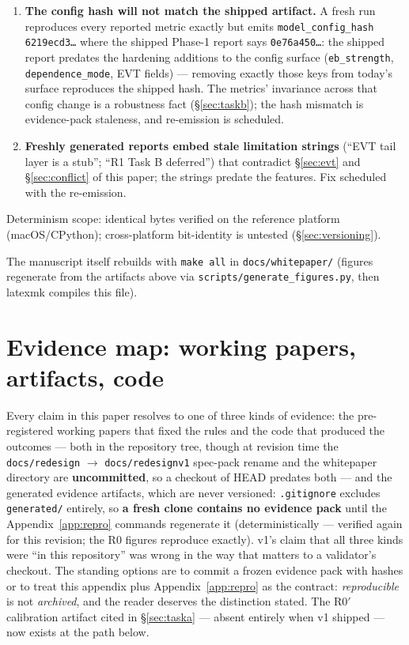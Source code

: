 \documentclass[11pt]{article}
\begin{document}
\begin{enumerate}[leftmargin=1.6em]
\item \textbf{The config hash will not match the shipped artifact.} A fresh
  run reproduces every reported metric exactly but emits
  \texttt{model\_config\_hash 6219ecd3\ldots} where the shipped Phase-1
  report says \texttt{0e76a450\ldots}: the shipped report predates the
  hardening additions to the config surface (\texttt{eb\_strength},
  \texttt{dependence\_mode}, EVT fields) --- removing exactly those keys
  from today's surface reproduces the shipped hash. The metrics' invariance
  across that config change is a robustness fact (\S\ref{sec:taskb}); the
  hash mismatch is evidence-pack staleness, and re-emission is scheduled.
\item \textbf{Freshly generated reports embed stale limitation strings}
  (``EVT tail layer is a stub''; ``R1 Task B deferred'') that contradict
  \S\ref{sec:evt} and \S\ref{sec:conflict} of this paper; the strings
  predate the features. Fix scheduled with the re-emission.
\end{enumerate}

Determinism scope: identical bytes verified on the reference platform
(macOS/CPython); cross-platform bit-identity is untested
(\S\ref{sec:versioning}).

The manuscript itself rebuilds with \texttt{make all} in
\texttt{docs/whitepaper/} (figures regenerate from the artifacts above via
\texttt{scripts/generate\_figures.py}, then latexmk compiles this file).

\section{Evidence map: working papers, artifacts, code}
\label{app:evidence}

Every claim in this paper resolves to one of three kinds of evidence: the
pre-registered working papers that fixed the rules and the code that
produced the outcomes --- both in the repository tree, though at revision
time the \texttt{docs/redesign} $\to$ \texttt{docs/redesignv1} spec-pack
rename and the whitepaper directory are \textbf{uncommitted}, so a checkout
of HEAD predates both --- and the generated evidence artifacts, which are
never versioned: \texttt{.gitignore} excludes \texttt{generated/} entirely,
so \textbf{a fresh clone contains no evidence pack} until the
Appendix~\ref{app:repro} commands regenerate it (deterministically ---
verified again for this revision; the R0 figures reproduce exactly). v1's
claim that all three kinds were ``in this repository'' was wrong in the way
that matters to a validator's checkout. The standing options are to commit a
frozen evidence pack with hashes or to treat this appendix plus
Appendix~\ref{app:repro} as the contract: \emph{reproducible} is not
\emph{archived}, and the reader deserves the distinction stated. The R0$'$
calibration artifact cited in \S\ref{sec:taska} --- absent entirely when v1
shipped --- now exists at the path below.
\end{document}
